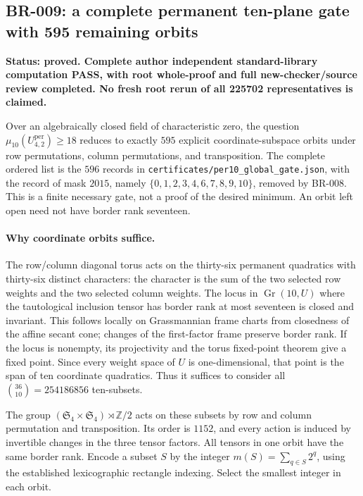 \subsection*{BR-009: a complete permanent ten-plane gate with 595 remaining orbits}
\textbf{Status: proved.  Complete author independent standard-library computation
PASS, with root whole-proof and full new-checker/source review completed.
No fresh root rerun of all 225702 representatives is claimed.}

Over an algebraically closed field of characteristic zero, the question
$\mu_{10}(U^{\mathrm{per}}_{4,2})\ge18$ reduces to exactly $595$ explicit
coordinate-subspace orbits under row permutations, column permutations,
and transposition.  The complete ordered list is the $596$ records in
\texttt{certificates/per10\_global\_gate.json}, with the record
of mask $2015$, namely $\{0,1,2,3,4,6,7,8,9,10\}$, removed by BR-008.
This is a finite necessary gate, not a proof of the desired minimum.
An orbit left open need not have border rank seventeen.

\paragraph{Why coordinate orbits suffice.}
The row/column diagonal torus acts on the thirty-six permanent
quadratics with thirty-six distinct characters: the character is the
sum of the two selected row weights and the two selected column
weights.  The locus in $\operatorname{Gr}(10,U)$ where the tautological
inclusion tensor has border rank at most seventeen is closed and
invariant.  This follows locally on Grassmannian frame charts from
closedness of the affine secant cone; changes of the first-factor
frame preserve border rank.  If the locus is nonempty, its projectivity
and the torus fixed-point theorem give a fixed point.  Since every
weight space of $U$ is one-dimensional, that point is the span of ten
coordinate quadratics.  Thus it suffices to consider all
$\binom{36}{10}=254186856$ ten-subsets.

The group $(\mathfrak S_4\times\mathfrak S_4)\rtimes\mathbb Z/2$
acts on these subsets by row and column permutation and transposition.
Its order is $1152$, and every action is induced by invertible changes
in the three tensor factors.  All tensors in one orbit have the same
border rank.  Encode a subset $S$ by the integer
$m(S)=\sum_{q\in S}2^q$, using the established lexicographic rectangle
indexing.  Select the smallest integer in each orbit.

